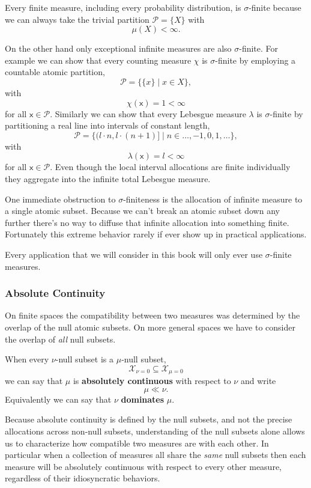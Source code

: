 \documentclass[
  letterpaper,
  DIV=11,
  numbers=noendperiod]{scrartcl}
\begin{document}
Every finite measure, including every probability distribution, is
\(\sigma\)-finite because we can always take the trivial partition
\(\mathcal{P} = \{ X \}\) with \[
\mu(X) < \infty.
\]

On the other hand only exceptional infinite measures are also
\(\sigma\)-finite. For example we can show that every counting measure
\(\chi\) is \(\sigma\)-finite by employing a countable atomic partition,
\[
\mathcal{P} = \{ \{ x \} \mid x \in X \},
\] with \[
\chi( \mathsf{x} ) = 1 < \infty
\] for all \(\mathsf{x} \in \mathcal{P}\). Similarly we can show that
every Lebesgue measure \(\lambda\) is \(\sigma\)-finite by partitioning
a real line into intervals of constant length, \[
\mathcal{P} =
\{ ( l \cdot n, l \cdot (n + 1) ] \mid n \in \ldots, -1, 0, 1, \ldots \},
\] with \[
\lambda( \mathsf{x} ) = l < \infty
\] for all \(\mathsf{x} \in \mathcal{P}\). Even though the local
interval allocations are finite individually they aggregate into the
infinite total Lebesgue measure.

One immediate obstruction to \(\sigma\)-finiteness is the allocation of
infinite measure to a single atomic subset. Because we can't break an
atomic subset down any further there's no way to diffuse that infinite
allocation into something finite. Fortunately this extreme behavior
rarely if ever show up in practical applications.

Every application that we will consider in this book will only ever use
\(\sigma\)-finite measures.

\hypertarget{absolute-continuity}{%
\subsubsection{Absolute Continuity}\label{absolute-continuity}}

On finite spaces the compatibility between two measures was determined
by the overlap of the null atomic subsets. On more general spaces we
have to consider the overlap of \emph{all} null subsets.

When every \(\nu\)-null subset is a \(\mu\)-null subset, \[
\mathcal{X}_{\nu = 0} \subseteq \mathcal{X}_{\mu = 0}
\] we can say that \(\mu\) is \textbf{absolutely continuous} with
respect to \(\nu\) and write \[
\mu \ll \nu.
\] Equivalently we can say that \(\nu\) \textbf{dominates} \(\mu\).

Because absolute continuity is defined by the null subsets, and not the
precise allocations across non-null subsets, understanding of the null
subsets alone allows us to characterize how compatible two measures are
with each other. In particular when a collection of measures all share
the \emph{same} null subsets then each measure will be absolutely
continuous with respect to every other measure, regardless of their
idiosyncratic behaviors.
\end{document}
